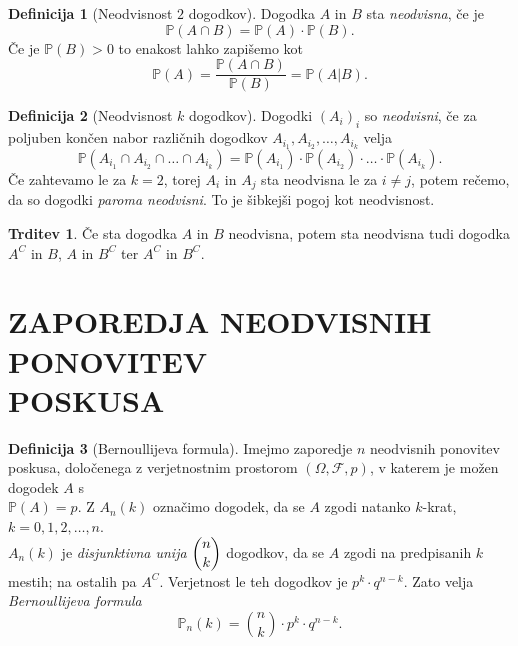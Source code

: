 \documentclass[11pt]{article}
\theoremstyle{definition}
\newtheorem{definicija}{Definicija}[section]
\theoremstyle{definition}
\newtheorem{trditev}{Trditev}[section]
\theoremstyle{definition}
\begin{document}
\begin{definicija}[Neodvisnost $2$ dogodkov]

Dogodka $A$ in $B$ sta \textit{neodvisna}, če je 
$$\mathbb{P}(A \cap B) = \mathbb{P}(A) \cdot \mathbb{P}(B).$$
Če je $\mathbb{P}(B) > 0$ to enakost lahko zapišemo kot
$$\mathbb{P}(A) = \frac{\mathbb{P}(A \cap B)}{\mathbb{P}(B)} = \mathbb{P}(A | B).$$

\end{definicija}
\vspace{0.5cm}

\begin{definicija}[Neodvisnost $k$ dogodkov]

Dogodki $(A_i)_i$ so \textit{neodvisni}, če za poljuben končen nabor različnih dogodkov $A_{i_1}, A_{i_2}, \ldots, A_{i_k}$ velja
$$\mathbb{P}(A_{i_1} \cap A_{i_2} \cap \ldots \cap A_{i_k}) = \mathbb{P}(A_{i_1}) \cdot \mathbb{P}(A_{i_2}) \cdot \ldots \cdot \mathbb{P}(A_{i_k}).$$
Če zahtevamo le za $k = 2$, torej $A_i$ in $A_j$ sta neodvisna le za $i \neq j$, potem rečemo, da so dogodki \textit{paroma neodvisni}. To je šibkejši pogoj kot neodvisnost.

\end{definicija}

\begin{trditev}

Če sta dogodka $A$ in $B$ neodvisna, potem sta neodvisna tudi dogodka $A^C$ in $B$, $A$ in $B^C$ ter $A^C$ in $B^C$.

\end{trditev}
\vspace{0.5cm}


\pagebreak


\section{ZAPOREDJA NEODVISNIH PONOVITEV \\POSKUSA}
\vspace{0.5cm}

\begin{definicija}[Bernoullijeva formula]

Imejmo zaporedje $n$ neodvisnih ponovitev poskusa, določenega z verjetnostnim prostorom $(\Omega, \mathcal{F}, p)$, v katerem je možen dogodek $A$ s \\$\mathbb{P}(A) = p$.
Z $A_n(k)$ označimo dogodek, da se $A$ zgodi natanko $k$-krat, $k = 0, 1, 2, \ldots, n$. \\

\noindent $A_n(k)$ je \textit{disjunktivna unija} $\mathlarger{\binom{n}{k}}$ dogodkov, da se $A$ zgodi na predpisanih $k$ mestih; na ostalih pa $A^C$. Verjetnost le teh dogodkov je $p^k \cdot q^{n-k}$. Zato velja \textit{Bernoullijeva formula}
$$\mathbb{P}_n(k) = \binom{n}{k} \cdot p^k \cdot q^{n-k}.$$

\end{definicija}
\vspace{0.5cm}
\end{document}

